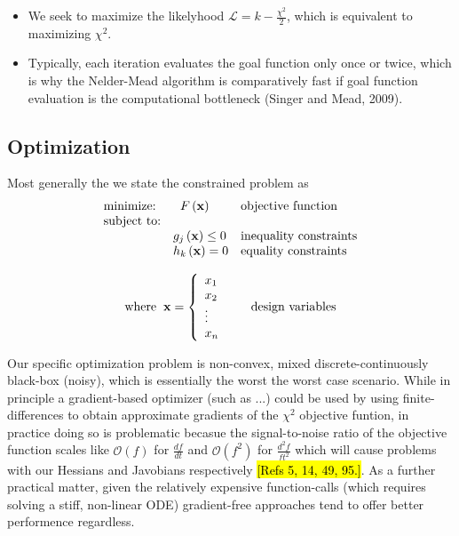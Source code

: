 \documentclass[10pt,a4paper]{article}
\begin{document}
\begin{itemize}
\item We seek to maximize the likelyhood $\mathcal{L} = k - \frac{\chi^2}{2}$, which is equivalent to maximizing $\chi^2$.
\item Typically, each iteration evaluates the goal function only once or twice, which is why the Nelder-Mead algorithm is comparatively fast if goal function evaluation is the computational bottleneck (Singer and Mead, 2009).
\end{itemize}

\subsection{Optimization}
Most generally the we state the constrained problem as 
\[
\begin{array}{lll}
\mbox{minimize:} & \hspace{2 mm} F\left(\mathbf{x}\right) & \mbox{objective function}\\
\mbox{subject to:} & & \\
& \centering g_j \left( \mathbf{x} \right) \leq 0 & \mbox{inequality constraints}\\
& \centering h_k \left(\mathbf{x} \right) = 0 & \mbox{equality constraints}
\end{array}
 \]

\[ 
\begin{array}{ll}
\mbox{where} \hspace{2 mm} \mathbf{x} = \left\{ \begin{array}{ll}

x_1 & \\
x_2 & \\
\vdots &\\
x_n &
\end{array} \right. & \mbox{design variables}
\end{array}
\]

Our specific optimization problem is non-convex, mixed discrete-continuously black-box (noisy), which is essentially the worst the worst case scenario. While in principle a gradient-based optimizer (such as ...) could be used by using finite-differences to obtain approximate gradients of the $\chi^2$ objective funtion, in practice doing so is problematic becasue the signal-to-noise ratio of the objective function scales like $\mathcal{O}(f)$ for $\frac{df}{dt}$ and $\mathcal{O}(f^2)$ for $\frac{d^2f}{ft^2}$ which will cause problems with our Hessians and Javobians respectively \hl{[Refs 5, 14, 49, 95.]}. As a further practical matter, given the relatively expensive function-calls (which requires solving a stiff, non-linear ODE) gradient-free approaches tend to offer better performence regardless. 
\end{document}
